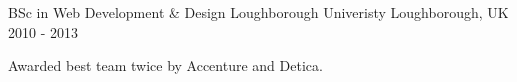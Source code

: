 

\begin{cventries}

  \cventry
    {BSc in Web Development \& Design} %
    {Loughborough Univeristy} %
    {Loughborough, UK} %
    {2010 - 2013} %
    {
      \begin{cvitems} %
        \item {Awarded best team twice by Accenture and Detica.}
      \end{cvitems}
    }

\end{cventries}
